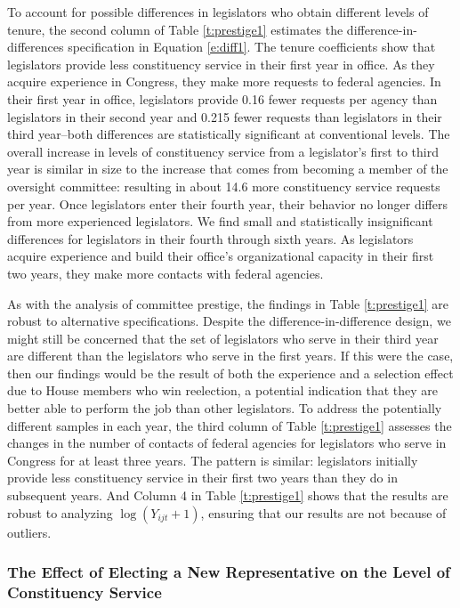 \documentclass[12pt]{article}
\begin{document}
To account for possible differences in legislators who obtain different levels of tenure, the second column of Table \ref{t:prestige1} estimates the difference-in-differences specification in Equation \ref{e:diff1}. The tenure coefficients show that legislators provide less constituency service in their first year in office. As they acquire experience in Congress, they make more requests to federal agencies. In their first year in office, legislators provide 0.16 fewer requests per agency than legislators in their second year and 0.215 fewer requests than legislators in their third year--both differences are statistically significant at conventional levels. The overall increase in levels of constituency service from a legislator's first to third year is similar in size to the increase that comes from becoming a member of the oversight committee: resulting in about 14.6 more constituency service requests per year. Once legislators enter their fourth year, their behavior no longer differs from more experienced legislators. We find small and statistically insignificant differences for legislators in their fourth through sixth years. As legislators acquire experience and build their office's organizational capacity in their first two years, they make more contacts with federal agencies.  

As with the analysis of committee prestige, the findings in Table \ref{t:prestige1} are robust to alternative specifications. Despite the difference-in-difference design, we might still be concerned that the set of legislators who serve in their third year are different than the legislators who serve in the first years. If this were the case, then our findings would be the result of both the experience and a selection effect due to House members who win reelection, a potential indication that they are better able to perform the job than other legislators. To address the potentially different samples in each year, the third column of Table \ref{t:prestige1} assesses the changes in the number of contacts of federal agencies for legislators who serve in Congress for at least three years. The pattern is similar: legislators initially provide less constituency service in their first two years than they do in subsequent years. And Column 4 in Table \ref{t:prestige1} shows that the results are robust to analyzing $\log(Y_{ijt} + 1)$, ensuring that our results are not because of outliers.  

\subsubsection{The Effect of Electing a New Representative on the Level of Constituency Service}\label{s:tenure_dist}
\end{document}
